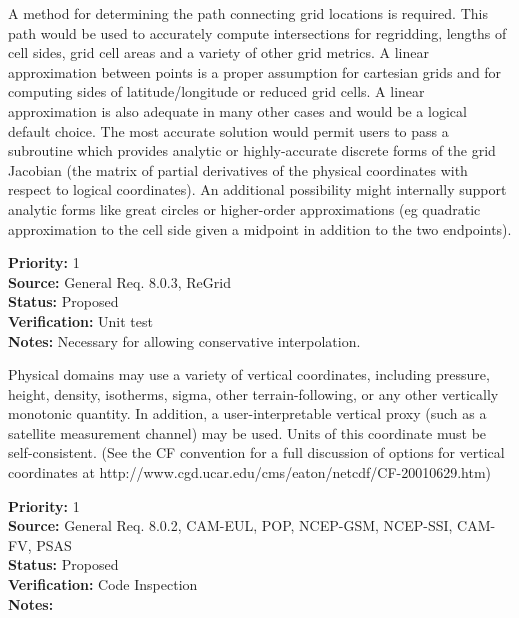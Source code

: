 
A method for determining the path connecting grid locations 
is required.  This path would be used to accurately compute
intersections for regridding, lengths of cell sides, grid
cell areas and a variety of other grid metrics.  A linear 
approximation between points is a proper assumption for 
cartesian grids and for computing sides of latitude/longitude
or reduced grid cells.  A linear approximation is also 
adequate in many other cases and would be a logical default choice. 
The most accurate solution would permit users to pass a 
subroutine which provides analytic or highly-accurate discrete 
forms of the grid Jacobian (the matrix of partial derivatives of 
the physical coordinates with respect to logical coordinates).  An 
additional possibility might internally support analytic forms like 
great circles or higher-order approximations (eg quadratic
approximation to the cell side given a midpoint in addition
to the two endpoints).

\begin{reqlist}
{\bf Priority:} 1 \\
{\bf Source:} General Req. 8.0.3, ReGrid \\
{\bf Status:} Proposed \\
{\bf Verification:} Unit test\\
{\bf Notes:} Necessary for allowing conservative interpolation.
\end{reqlist}



Physical domains may use a variety of vertical coordinates, including pressure,
height, density, isotherms, sigma, other terrain-following, or any other
vertically monotonic quantity.  In addition, a user-interpretable vertical
proxy (such as a satellite measurement channel) may be used.  Units of this
coordinate must be self-consistent.  (See the CF convention for a full
discussion of options for vertical coordinates at
http://www.cgd.ucar.edu/cms/eaton/netcdf/CF-20010629.htm)
\begin{reqlist}
{\bf Priority:} 1 \\
{\bf Source:} General Req. 8.0.2, CAM-EUL, POP, NCEP-GSM, NCEP-SSI,
              CAM-FV, PSAS \\
{\bf Status:} Proposed \\
{\bf Verification:} Code Inspection\\
{\bf Notes:} 
\end{reqlist}

